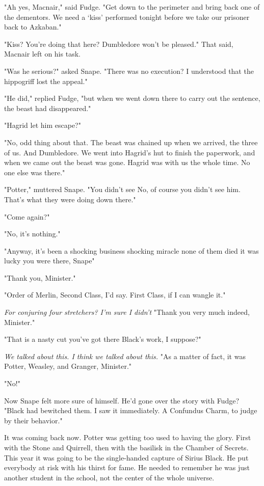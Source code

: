 "Ah yes, Macnair," said Fudge. "Get down to the perimeter and bring back one of the dementors. We need a `kiss' performed tonight before we take our prisoner back to Azkaban."

"Kiss? You're doing that here? Dumbledore won't be pleased." That said, Macnair left on his task.

"Was he serious?" asked Snape. "There was no execution? I understood that the hippogriff lost the appeal."

"He did," replied Fudge, "but when we went down there to carry out the sentence, the beast had disappeared."

"Hagrid let him escape?"

"No, odd thing about that. The beast was chained up when we arrived, the three of us. And Dumbledore. We went into Hagrid's hut to finish the paperwork, and when we came out the beast was gone. Hagrid was with us the whole time. No one else was there."

"Potter," muttered Snape. "You didn't see{\el} No, of course you didn't see him. That's what they were doing down there."

"Come again?"

"No, it's nothing."

"Anyway, it's been a shocking business{\el} shocking{\el} miracle none of them died{\el} it was lucky you were there, Snape{\el}"

"Thank you, Minister."

"Order of Merlin, Second Class, I'd say. First Class, if I can wangle it."

\emph{For conjuring four stretchers? I'm sure I didn't{\el}} "Thank you very much indeed, Minister."

"That is a nasty cut you've got there{\el} Black's work, I suppose?"

\emph{We talked about this. I think we talked about this.} "As a matter of fact, it was Potter, Weasley, and Granger, Minister."

"No!"

Now Snape felt more sure of himself. He'd gone over the story with{\el} Fudge? "Black had bewitched them. I saw it immediately. A Confundus Charm, to judge by their behavior."

It was coming back now. Potter was getting too used to having the glory. First with the Stone and Quirrell, then with the basilisk in the Chamber of Secrets. This year it was going to be the single-handed capture of Sirius Black. He put everybody at risk with his thirst for fame. He needed to remember he was just another student in the school, not the center of the whole universe.

